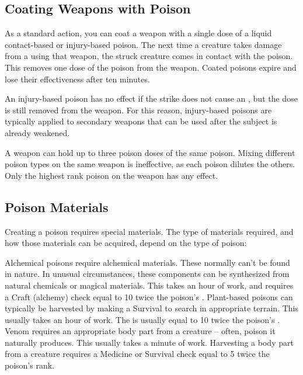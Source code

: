   \subsection{Coating Weapons with Poison}\label{Coating Weapons with Poison}
    As a standard action, you can coat a weapon with a single dose of a liquid contact-based or injury-based poison.
    The next time a creature takes damage from a  using that weapon, the struck creature comes in contact with the poison.
    This removes one dose of the poison from the weapon.
    Coated poisons expire and lose their effectiveness after ten minutes.

    An injury-based poison has no effect if the strike does not cause an , but the dose is still removed from the weapon.
    For this reason, injury-based poisons are typically applied to secondary weapons that can be used after the subject is already weakened.

    A weapon can hold up to three poison doses of the same poison.
    Mixing different poison types on the same weapon is ineffective, as each poison dilutes the others.
    Only the highest rank poison on the weapon has any effect.

  \subsection{Poison Materials}\label{Poison Materials}
    Creating a poison requires special materials.
    The type of materials required, and how those materials can be acquired, depend on the type of poison:

    \begin{raggeditemize}
       Alchemical poisons require alchemical materials.
        These normally can't be found in nature.
        In unusual circumstances, these components can be synthesized from natural chemicals or magical materials.
        This takes an hour of work, and requires a Craft (alchemy) check equal to 10 \add twice the poison's .
       Plant-based poisons can typically be harvested by making a Survival  to search in appropriate terrain.
        This usually takes an hour of work.
        The  is usually equal to 10 \add twice the poison's .
       Venom requires an appropriate body part from a creature -- often, poison it naturally produces.
        This usually takes a minute of work.
        Harvesting a body part from a creature requires a Medicine or Survival check equal to 5 \add twice the poison's rank.
    \end{raggeditemize}
